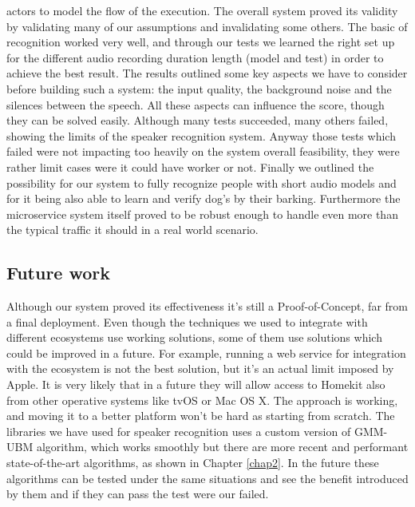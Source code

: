 actors to model the flow of the execution.
The overall system proved its validity by validating many of our assumptions and
invalidating some others. The basic of recognition worked very well, and through
our tests we learned the right set up for the different audio recording duration length (model and test)
in order to achieve the best result. The results outlined some key aspects we have to consider
before building such a system: the input quality, the background noise and the silences between the speech.
All these aspects can influence the score, though they can be solved easily. Although many
tests succeeded, many others failed, showing the limits of the speaker recognition system. Anyway those
tests which failed were not impacting too heavily on the system overall feasibility, they were rather
limit cases were it could have worker or not.\newline
Finally we outlined the possibility for our system to fully recognize people with short
audio models and for it being also able to learn and verify dog's by their barking. Furthermore
the microservice system itself proved to be robust enough to handle even more than the typical
traffic it should in a real world scenario.


\subsection{Future work}

Although our system proved its effectiveness it's still a Proof-of-Concept,
far from a final deployment. Even though the techniques we used to integrate with
different ecosystems use working solutions, some of them use solutions
which could be improved in a future. For example, running a web service for integration
with the ecosystem is not the best solution, but it's an actual limit imposed by Apple.
It is very likely that in a future they will allow access to Homekit also from other
operative systems like tvOS or Mac OS X. The approach is working, and moving it to a better
platform won't be hard as starting from scratch.\newline
The libraries we have used for speaker recognition uses a custom version of GMM-UBM algorithm,
which works smoothly but there are more recent and performant state-of-the-art algorithms,
as shown in Chapter \ref{chap2}. In the future these algorithms can be tested under the same
situations and see the benefit introduced by them and if they can pass the test were
our failed.
